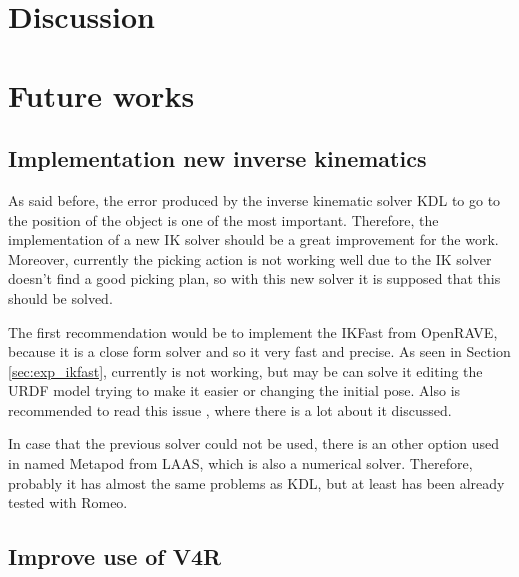 \documentclass[12pt,a4paper,final,twoside,openright]{report}
\begin{document}
\chapter{Discussion}
\label{cha:discussion}

\chapter{Future works}
\label{cha:future_works}
\section{Implementation new inverse kinematics}

As said before, the error produced by the inverse kinematic solver KDL to go to the position of the object is one of the most important. Therefore, the implementation of a new IK solver should be a great improvement for the work. Moreover, currently the picking action is not working well due to the IK solver doesn't find a good picking plan, so with this new solver it is supposed that this should be solved.

The first recommendation would be to implement the IKFast from OpenRAVE, because it is a close form solver and so it very fast and precise. As seen in Section \ref{sec:exp_ikfast}, currently is not working, but may be can solve it editing the URDF model trying to make it easier or changing the initial pose. Also is recommended to read this issue \cite{romeoRobotIssue}, where there is a lot about it discussed.

In case that the previous solver could not be used, there is an other option used in \cite{claudio:hal-01159882} named Metapod from LAAS, which is also a numerical solver. Therefore, probably it has almost the same problems as KDL, but at least has been already tested with Romeo.  

\section{Improve use of V4R}
\end{document}
